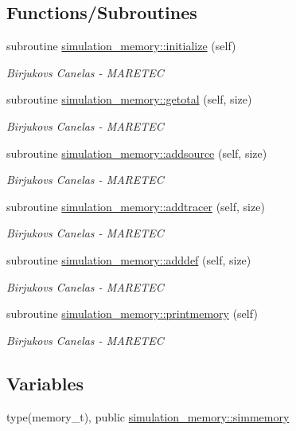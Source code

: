\subsection*{Functions/\+Subroutines}
\begin{DoxyCompactItemize}
\item 
subroutine \mbox{\hyperlink{namespacesimulation__memory_a3b8f4e0766c90e6d6bd99e2fa49ea91b}{simulation\+\_\+memory\+::initialize}} (self)
\begin{DoxyCompactList}\small\item\em Birjukovs Canelas -\/ M\+A\+R\+E\+T\+EC \end{DoxyCompactList}\item 
subroutine \mbox{\hyperlink{namespacesimulation__memory_a8589522c4e28cf60741a5439477cdb31}{simulation\+\_\+memory\+::getotal}} (self, size)
\begin{DoxyCompactList}\small\item\em Birjukovs Canelas -\/ M\+A\+R\+E\+T\+EC \end{DoxyCompactList}\item 
subroutine \mbox{\hyperlink{namespacesimulation__memory_acf01ce7bcb2d7571d37fb2c0338e5bd2}{simulation\+\_\+memory\+::addsource}} (self, size)
\begin{DoxyCompactList}\small\item\em Birjukovs Canelas -\/ M\+A\+R\+E\+T\+EC \end{DoxyCompactList}\item 
subroutine \mbox{\hyperlink{namespacesimulation__memory_a4d6c8bd027a99cb6c7f9ad2eb55c744f}{simulation\+\_\+memory\+::addtracer}} (self, size)
\begin{DoxyCompactList}\small\item\em Birjukovs Canelas -\/ M\+A\+R\+E\+T\+EC \end{DoxyCompactList}\item 
subroutine \mbox{\hyperlink{namespacesimulation__memory_a62d5641dbec45bc279575c173b0f0f24}{simulation\+\_\+memory\+::adddef}} (self, size)
\begin{DoxyCompactList}\small\item\em Birjukovs Canelas -\/ M\+A\+R\+E\+T\+EC \end{DoxyCompactList}\item 
subroutine \mbox{\hyperlink{namespacesimulation__memory_a5827bef8479b809a453af147ceaa8c7c}{simulation\+\_\+memory\+::printmemory}} (self)
\begin{DoxyCompactList}\small\item\em Birjukovs Canelas -\/ M\+A\+R\+E\+T\+EC \end{DoxyCompactList}\end{DoxyCompactItemize}
\subsection*{Variables}
\begin{DoxyCompactItemize}
\item 
type(memory\+\_\+t), public \mbox{\hyperlink{namespacesimulation__memory_a8ed2bc20b0c49405084442d02fc76d42}{simulation\+\_\+memory\+::simmemory}}
\end{DoxyCompactItemize}
